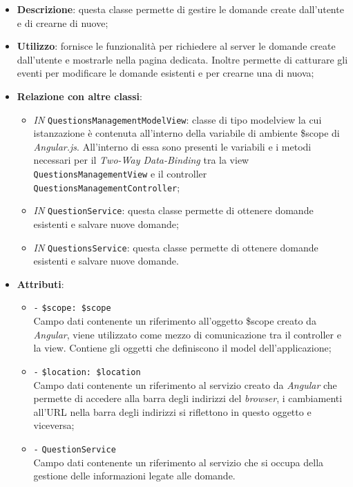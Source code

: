 \begin{itemize}
	\item \textbf{Descrizione}: questa classe permette di gestire le domande create dall'utente e di crearne di nuove;
	\item \textbf{Utilizzo}: fornisce le funzionalità per richiedere al server le domande create dall'utente e mostrarle nella pagina dedicata. Inoltre permette di catturare gli eventi per modificare le domande esistenti e per crearne una di nuova; 
	\item \textbf{Relazione con altre classi}:
	\begin{itemize}
		\item \textit{IN} \texttt{QuestionsManagementModelView}: classe di tipo modelview la cui istanzazione è contenuta all'interno della variabile di ambiente \$scope di \textit{Angular.js}. All'interno di essa sono presenti le variabili e i metodi necessari per il \textit{Two-Way Data-Binding} tra la view \texttt{QuestionsManagementView} e il controller \texttt{QuestionsManagementController}; 
		\item \textit{IN} \texttt{QuestionService}: questa classe permette di ottenere domande esistenti e salvare nuove domande;
		\item \textit{IN} \texttt{QuestionsService}: questa classe permette di ottenere domande esistenti e salvare nuove domande.
	\end{itemize}
	\item \textbf{Attributi}:
	\begin{itemize}
		\item \texttt{-} \texttt{\$scope: \$scope} \\
		Campo dati contenente un riferimento all’oggetto \$scope creato da \textit{Angular}, viene utilizzato come mezzo di comunicazione tra il controller e la view. Contiene gli oggetti che definiscono il model dell’applicazione;
		\item \texttt{-} \texttt{\$location: \$location} \\
		Campo dati contenente un riferimento al servizio creato da \textit{Angular} che permette di accedere alla barra degli indirizzi del \textit{browser}, i cambiamenti all’URL nella barra degli indirizzi si riflettono in questo oggetto e viceversa;
		\item \texttt{-} \texttt{QuestionService}\\
		Campo dati contenente un riferimento al servizio che si occupa della gestione delle informazioni legate alle domande.
	\end{itemize}

\end{itemize}
